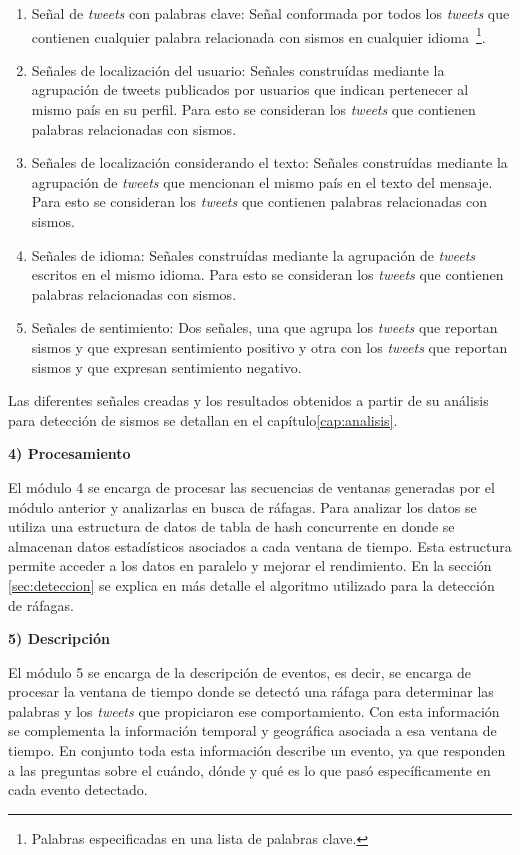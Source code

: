 \begin{enumerate}
\item Señal de \textit{tweets} con palabras clave: Señal conformada por todos los \textit{tweets} que contienen cualquier palabra relacionada con sismos en cualquier idioma~\footnote{Palabras especificadas en una lista de palabras clave.}. 
\item Señales de localización del usuario: Señales construídas mediante la agrupación de tweets publicados por usuarios que indican pertenecer al mismo país en su perfil. Para esto se consideran los \textit{tweets} que contienen palabras relacionadas con sismos.
\item Señales de localización considerando el texto: Señales construídas mediante la agrupación de \textit{tweets} que mencionan el mismo país en el texto del mensaje. Para esto se consideran los \textit{tweets} que contienen palabras relacionadas con sismos.
\item Señales de idioma: Señales construídas mediante la agrupación de \textit{tweets} escritos en el mismo idioma. Para esto se consideran los \textit{tweets} que contienen palabras relacionadas con sismos.
\item Señales de sentimiento: Dos señales, una que agrupa los \textit{tweets} que reportan sismos y que expresan sentimiento positivo y otra con los \textit{tweets} que reportan sismos y que expresan sentimiento negativo. 
\end{enumerate}

Las diferentes señales creadas y los resultados obtenidos a partir de su análisis para detección de sismos se detallan en el capítulo\ref{cap:analisis}.

\noindent\textbf{4) Procesamiento}

El módulo 4 se encarga de procesar las secuencias de ventanas generadas por el módulo anterior y analizarlas en busca de ráfagas.  
%
Para analizar los datos se utiliza una estructura de datos de tabla de hash concurrente en donde se almacenan datos estadísticos asociados a cada ventana de tiempo. Esta estructura permite acceder a los datos en paralelo y mejorar el rendimiento.
%
En la sección \ref{sec:deteccion} se explica en más detalle el algoritmo utilizado para la detección de ráfagas.

\noindent\textbf{5) Descripción}

El módulo 5 se encarga de la descripción de eventos, es decir, se encarga de procesar la ventana de tiempo donde se detectó una ráfaga para determinar las palabras y los \textit{tweets} que propiciaron ese comportamiento.
%
Con esta información se complementa la información temporal y geográfica asociada a esa ventana de tiempo.
%
En conjunto toda esta información describe un evento, ya que responden a las preguntas sobre el cuándo, dónde y qué es lo que pasó específicamente en cada evento detectado.


